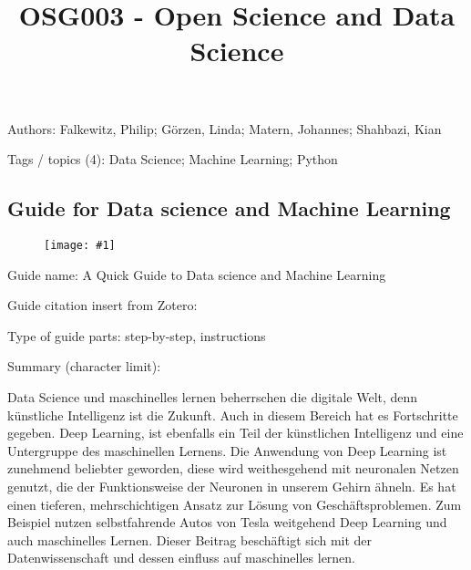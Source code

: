 \documentclass{article}
\newlength{\imgwidth}
\newcommand\scaledgraphics[2]{%
                
\settowidth{\imgwidth}{\texttt{[image: \#1]}}%
                
\setlength{\imgwidth}{\minof{\imgwidth}{#2\textwidth}}%
                
\texttt{[image: \#1]}%
                
}
\begin{document}
\title{OSG003 - Open Science and Data Science}

\maketitle


Authors: Falkewitz, Philip;  Görzen, Linda; Matern, Johannes;  Shahbazi, Kian 


Tags / topics (4): Data Science; Machine Learning; Python


\subsection{Guide for Data science and Machine Learning}\label{H7151279}






\begin{center}
\begin{figure}
\scaledgraphics{a6637b1c-427c-4ae5-a756-e31455d2fc96.png}{0.5}
\label{F25480991}
\end{figure}


\end{center}


 


Guide name: A Quick Guide to Data science and Machine Learning


Guide citation insert from Zotero: \autocite{qureshi_quick_2020}





Type of guide parts: step-by-step, instructions


Summary (character limit): 


Data Science und maschinelles lernen beherrschen die digitale Welt, denn künstliche Intelligenz ist die Zukunft. Auch in diesem Bereich hat es Fortschritte gegeben. Deep Learning, ist ebenfalls ein Teil der künstlichen Intelligenz und eine Untergruppe des maschinellen Lernens. Die Anwendung von Deep Learning ist zunehmend beliebter geworden, diese wird weithesgehend mit neuronalen Netzen genutzt, die der Funktionsweise der Neuronen in unserem Gehirn ähneln. Es hat einen tieferen, mehrschichtigen Ansatz zur Lösung von Geschäftsproblemen. Zum Beispiel nutzen selbstfahrende Autos von Tesla weitgehend Deep Learning und auch maschinelles Lernen. Dieser Beitrag beschäftigt sich mit der Datenwissenschaft und dessen einfluss auf maschinelles lernen.
\end{document}
